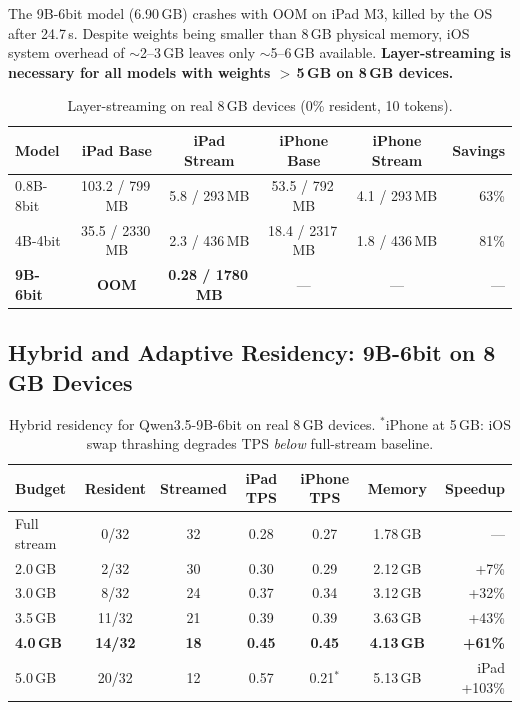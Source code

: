 \documentclass[10pt,a4paper]{article}
\begin{document}
The 9B-6bit model (6.90\,GB) crashes with OOM on iPad M3, killed by the OS after 24.7\,s. Despite weights being smaller than 8\,GB physical memory, iOS system overhead of $\sim$2--3\,GB leaves only $\sim$5--6\,GB available. \textbf{Layer-streaming is necessary for all models with weights $>$\,5\,GB on 8\,GB devices.}

\begin{table}[ht!]
\centering\small
\caption{Layer-streaming on real 8\,GB devices (0\% resident, 10 tokens).}
\label{tab:device_streaming}
\begin{tabular}{lccccr}
\toprule
\textbf{Model} & \textbf{iPad Base} & \textbf{iPad Stream} & \textbf{iPhone Base} & \textbf{iPhone Stream} & \textbf{Savings} \\
\midrule
0.8B-8bit & 103.2 / 799\,MB & 5.8 / 293\,MB & 53.5 / 792\,MB & 4.1 / 293\,MB & 63\% \\
4B-4bit & 35.5 / 2330\,MB & 2.3 / 436\,MB & 18.4 / 2317\,MB & 1.8 / 436\,MB & 81\% \\
\textbf{9B-6bit} & \textbf{OOM} & \textbf{0.28 / 1780\,MB} & --- & --- & --- \\
\bottomrule
\end{tabular}
\end{table}

\subsection{Hybrid and Adaptive Residency: 9B-6bit on 8\,GB Devices}

\begin{table}[ht!]
\centering\small
\caption{Hybrid residency for Qwen3.5-9B-6bit on real 8\,GB devices. $^*$iPhone at 5\,GB: iOS swap thrashing degrades TPS \emph{below} full-stream baseline.}
\label{tab:hybrid}
\begin{tabular}{lcccccr}
\toprule
\textbf{Budget} & \textbf{Resident} & \textbf{Streamed} & \textbf{iPad TPS} & \textbf{iPhone TPS} & \textbf{Memory} & \textbf{Speedup} \\
\midrule
Full stream  & 0/32  & 32 & 0.28 & 0.27 & 1.78\,GB & --- \\
2.0\,GB      & 2/32  & 30 & 0.30 & 0.29 & 2.12\,GB & +7\% \\
3.0\,GB      & 8/32  & 24 & 0.37 & 0.34 & 3.12\,GB & +32\% \\
3.5\,GB      & 11/32 & 21 & 0.39 & 0.39 & 3.63\,GB & +43\% \\
\textbf{4.0\,GB} & \textbf{14/32} & \textbf{18} & \textbf{0.45} & \textbf{0.45} & \textbf{4.13\,GB} & \textbf{+61\%} \\
5.0\,GB      & 20/32 & 12 & 0.57 & 0.21$^*$ & 5.13\,GB & iPad +103\% \\
\bottomrule
\end{tabular}
\end{table}
\end{document}
